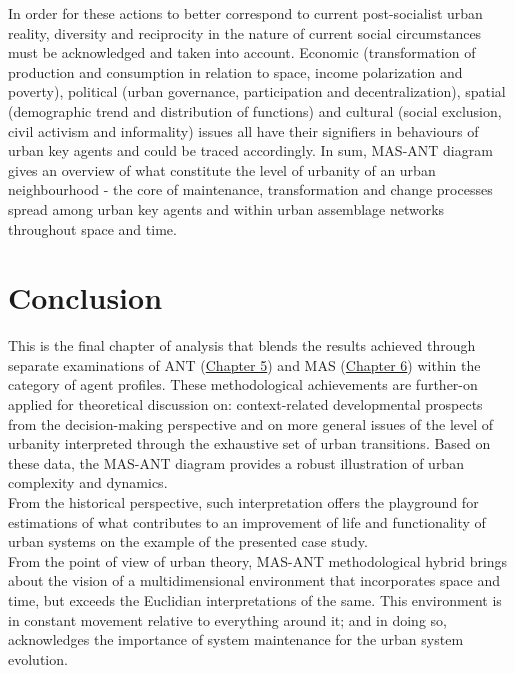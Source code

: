 \documentclass[11pt]{report}
\begin{document}
In order for these actions to better correspond to current post-socialist urban reality, diversity and reciprocity in the nature of current social circumstances must be acknowledged and taken into account.
Economic (transformation of production and consumption in relation to space, income polarization and poverty), political (urban governance, participation and decentralization), spatial (demographic trend and distribution of functions) and cultural (social exclusion, civil activism and informality) issues all have their signifiers in behaviours of urban key agents and could be traced accordingly.
In sum, MAS-ANT diagram gives an overview of what constitute the level of urbanity of an urban neighbourhood - the core of maintenance, transformation and change processes spread among urban key agents and within urban assemblage networks throughout space and time.

\section{Conclusion}

This is the final chapter of analysis that blends the results achieved through separate examinations of ANT (\href{Chapter 5}{Chapter 5}) and MAS (\href{Chapter 6}{Chapter 6}) within the category of agent profiles.
These methodological achievements are further-on applied for theoretical discussion on: context-related developmental prospects from the decision-making perspective and on more general issues of the level of urbanity interpreted through the exhaustive set of urban transitions.
Based on these data, the MAS-ANT diagram provides a robust illustration of urban complexity and dynamics.
\\

From the historical perspective, such interpretation offers the playground for estimations of what contributes to an improvement of life and functionality of urban systems on the example of the presented case study.
\\

From the point of view of urban theory, MAS-ANT methodological hybrid brings about the vision of a multidimensional environment that incorporates space and time, but exceeds the Euclidian interpretations of the same.
This environment is in constant movement relative to everything around it; and in doing so, acknowledges the importance of system maintenance for the urban system evolution. 
\\
\end{document}
